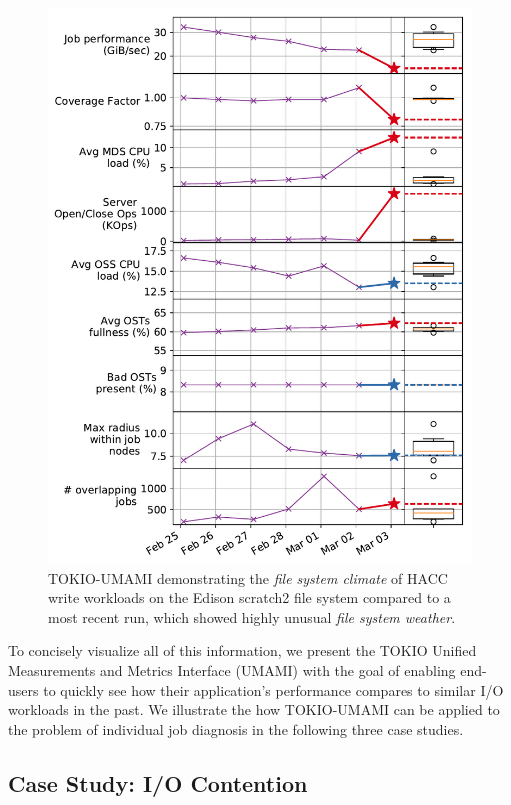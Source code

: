 \begin{figure}[t]
    \centering
    \includegraphics[width=1.0\columnwidth]{figs/umami-scratch2-hacc-write.pdf}
    \caption{TOKIO-UMAMI demonstrating the \emph{file system climate} of HACC write workloads
    on the Edison scratch2 file system compared to a most recent run, which showed
    highly unusual \emph{file system weather}.}
    \label{fig:umami-scratch2-hacc-write}
\end{figure}

To concisely visualize all of this information, we present the TOKIO Unified Measurements and Metrics Interface (UMAMI)
with the goal of enabling end-users to quickly see how their application's
performance compares to similar I/O workloads in the past.  We illustrate the
how TOKIO-UMAMI can be applied to the problem of individual job diagnosis in
the following three case studies.

\subsection{Case Study: I/O Contention}

